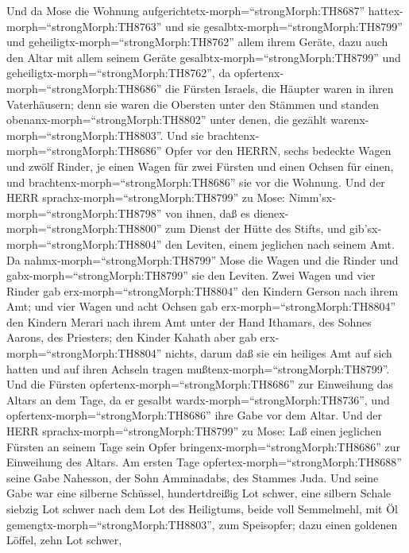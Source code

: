  Und da Mose die Wohnung
aufgerichtetx-morph=``strongMorph:TH8687''
hattex-morph=``strongMorph:TH8763'' und sie
gesalbtx-morph=``strongMorph:TH8799'' und
geheiligtx-morph=``strongMorph:TH8762'' allem ihrem Geräte, dazu auch
den Altar mit allem seinem Geräte gesalbtx-morph=``strongMorph:TH8799''
und geheiligtx-morph=``strongMorph:TH8762'',  da
opfertenx-morph=``strongMorph:TH8686'' die Fürsten Israels, die Häupter
waren in ihren Vaterhäusern; denn sie waren die Obersten unter den
Stämmen und standen obenanx-morph=``strongMorph:TH8802'' unter denen,
die gezählt warenx-morph=``strongMorph:TH8803''.  Und sie
brachtenx-morph=``strongMorph:TH8686'' Opfer vor den HERRN, sechs
bedeckte Wagen und zwölf Rinder, je einen Wagen für zwei Fürsten und
einen Ochsen für einen, und brachtenx-morph=``strongMorph:TH8686'' sie
vor die Wohnung.  Und der HERR
sprachx-morph=``strongMorph:TH8799'' zu Mose: 
Nimm'sx-morph=``strongMorph:TH8798'' von ihnen, daß es
dienex-morph=``strongMorph:TH8800'' zum Dienst der Hütte des Stifts, und
gib'sx-morph=``strongMorph:TH8804'' den Leviten, einem jeglichen nach
seinem Amt.  Da nahmx-morph=``strongMorph:TH8799'' Mose die
Wagen und die Rinder und gabx-morph=``strongMorph:TH8799'' sie den
Leviten.  Zwei Wagen und vier Rinder gab
erx-morph=``strongMorph:TH8804'' den Kindern Gerson nach ihrem Amt;
 und vier Wagen und acht Ochsen gab
erx-morph=``strongMorph:TH8804'' den Kindern Merari nach ihrem Amt unter
der Hand Ithamars, des Sohnes Aarons, des Priesters;  den
Kinder Kahath aber gab erx-morph=``strongMorph:TH8804'' nichts, darum
daß sie ein heiliges Amt auf sich hatten und auf ihren Achseln tragen
mußtenx-morph=``strongMorph:TH8799''.  Und die Fürsten
opfertenx-morph=``strongMorph:TH8686'' zur Einweihung das Altars an dem
Tage, da er gesalbt wardx-morph=``strongMorph:TH8736'', und
opfertenx-morph=``strongMorph:TH8686'' ihre Gabe vor dem Altar.
 Und der HERR sprachx-morph=``strongMorph:TH8799'' zu Mose:
Laß einen jeglichen Fürsten an seinem Tage sein Opfer
bringenx-morph=``strongMorph:TH8686'' zur Einweihung des Altars.
 Am ersten Tage opfertex-morph=``strongMorph:TH8688'' seine
Gabe Nahesson, der Sohn Amminadabs, des Stammes Juda.  Und
seine Gabe war eine silberne Schüssel, hundertdreißig Lot schwer, eine
silbern Schale siebzig Lot schwer nach dem Lot des Heiligtums, beide
voll Semmelmehl, mit Öl gemengtx-morph=``strongMorph:TH8803'', zum
Speisopfer;  dazu einen goldenen Löffel, zehn Lot schwer,
